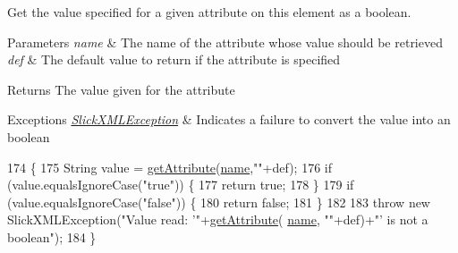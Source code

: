 Get the value specified for a given attribute on this element as a boolean.


\begin{DoxyParams}{Parameters}
{\em name} & The name of the attribute whose value should be retrieved \\
\hline
{\em def} & The default value to return if the attribute is specified \\
\hline
\end{DoxyParams}
\begin{DoxyReturn}{Returns}
The value given for the attribute 
\end{DoxyReturn}

\begin{DoxyExceptions}{Exceptions}
{\em \mbox{\hyperlink{classorg_1_1newdawn_1_1slick_1_1util_1_1xml_1_1_slick_x_m_l_exception}{Slick\+X\+M\+L\+Exception}}} & Indicates a failure to convert the value into an boolean \\
\hline
\end{DoxyExceptions}

\begin{DoxyCode}
174                                                                                           \{
175         String value = \mbox{\hyperlink{classorg_1_1newdawn_1_1slick_1_1util_1_1xml_1_1_x_m_l_element_a49543d209f2f2709c8e7a88fac034c69}{getAttribute}}(\mbox{\hyperlink{classorg_1_1newdawn_1_1slick_1_1util_1_1xml_1_1_x_m_l_element_aa96123a88e2614952c4d3d1a4207560a}{name}},\textcolor{stringliteral}{""}+def);
176         \textcolor{keywordflow}{if} (value.equalsIgnoreCase(\textcolor{stringliteral}{"true"})) \{
177             \textcolor{keywordflow}{return} \textcolor{keyword}{true};
178         \}
179         \textcolor{keywordflow}{if} (value.equalsIgnoreCase(\textcolor{stringliteral}{"false"})) \{
180             \textcolor{keywordflow}{return} \textcolor{keyword}{false};
181         \}
182         
183         \textcolor{keywordflow}{throw} \textcolor{keyword}{new} SlickXMLException(\textcolor{stringliteral}{"Value read: '"}+\mbox{\hyperlink{classorg_1_1newdawn_1_1slick_1_1util_1_1xml_1_1_x_m_l_element_a49543d209f2f2709c8e7a88fac034c69}{getAttribute}}(
      \mbox{\hyperlink{classorg_1_1newdawn_1_1slick_1_1util_1_1xml_1_1_x_m_l_element_aa96123a88e2614952c4d3d1a4207560a}{name}}, \textcolor{stringliteral}{""}+def)+\textcolor{stringliteral}{"' is not a boolean"});
184     \}
\end{DoxyCode}
\mbox{\label{classorg_1_1newdawn_1_1slick_1_1util_1_1xml_1_1_x_m_l_element_a10c6979b50971669482bb8e541e7d9f0}} 
